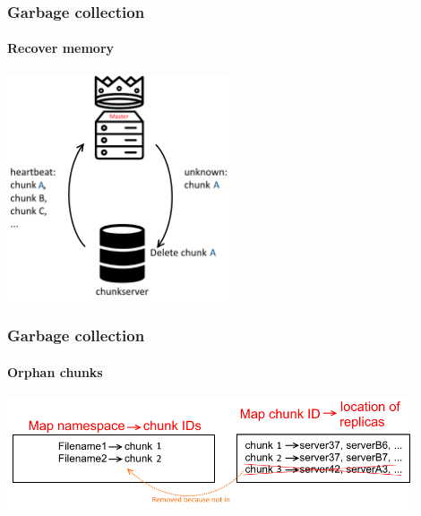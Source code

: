 \documentclass{beamer}
\newcommand{\slideheight}{6.7cm}
\newcommand{\slidewidth}{12cm}
\begin{document}
\begin{frame}
 \frametitle{Garbage collection}
 \framesubtitle{Recover memory}
 \centering
 \includegraphics[height=\slideheight]{figures/recoverymemoryschema.png}
\end{frame}

\begin{frame}
 \frametitle{Garbage collection}
 \framesubtitle{Orphan chunks}
 \centering
 \includegraphics[width=\slidewidth]{figures/orphanschema.png}
\end{frame}
\end{document}
